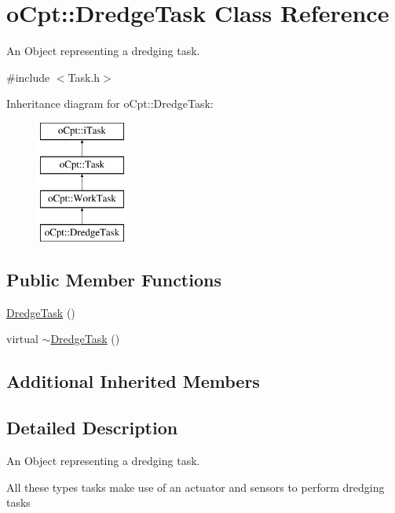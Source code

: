 \hypertarget{classo_cpt_1_1_dredge_task}{}\section{o\+Cpt\+:\+:Dredge\+Task Class Reference}
\label{classo_cpt_1_1_dredge_task}


An Object representing a dredging task.  




{\ttfamily \#include $<$Task.\+h$>$}

Inheritance diagram for o\+Cpt\+:\+:Dredge\+Task\+:\begin{figure}[H]
\begin{center}
\leavevmode
\includegraphics[height=4.000000cm]{classo_cpt_1_1_dredge_task}
\end{center}
\end{figure}
\subsection*{Public Member Functions}
\begin{DoxyCompactItemize}
\item 
\hyperlink{classo_cpt_1_1_dredge_task_a37790222747f5326d14a543e727b53fa}{Dredge\+Task} ()
\item 
virtual \hyperlink{classo_cpt_1_1_dredge_task_aa326cf6ddbb6e3019fb86f8d714bf323}{$\sim$\+Dredge\+Task} ()
\end{DoxyCompactItemize}
\subsection*{Additional Inherited Members}


\subsection{Detailed Description}
An Object representing a dredging task. 

All these types tasks make use of an actuator and sensors to perform dredging tasks 

